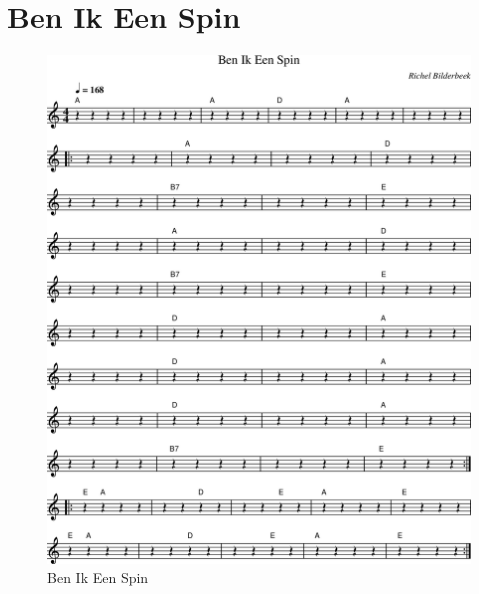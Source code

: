 \chapter{Ben Ik Een Spin}



\begin{figure}[!htbp]
  \includegraphics[width=\textwidth,height=\textheight,keepaspectratio]{../songs/49_ben_ik_een_spin.png}
  \caption{Ben Ik Een Spin}
  \label{fig:49_ben_ik_een_spin}
\end{figure}

